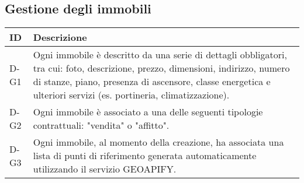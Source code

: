 \subsection*{Gestione degli immobili}

\begin{table}[H]
    \centering
    \renewcommand{\arraystretch}{1.3} %
    
    \begin{tabular}{|p{3cm}|p{10cm}|} 
        \hline
        \textbf{ID} & \textbf{Descrizione} \\  
        \hline
        D-G1 &  Ogni immobile è descritto da una serie di dettagli obbligatori, tra cui: foto, descrizione, prezzo, dimensioni, indirizzo, numero di stanze, piano, presenza di ascensore, classe energetica e ulteriori servizi (es. portineria, climatizzazione). \\ 
        \hline
        D-G2 &  Ogni immobile è associato a una delle seguenti tipologie contrattuali: "vendita" o "affitto". \\ 
        \hline
        D-G3 &  Ogni immobile, al momento della creazione, ha associata una lista di punti di riferimento generata automaticamente utilizzando il servizio GEOAPIFY. \\ 
        \hline
    \end{tabular}
    
\end{table}